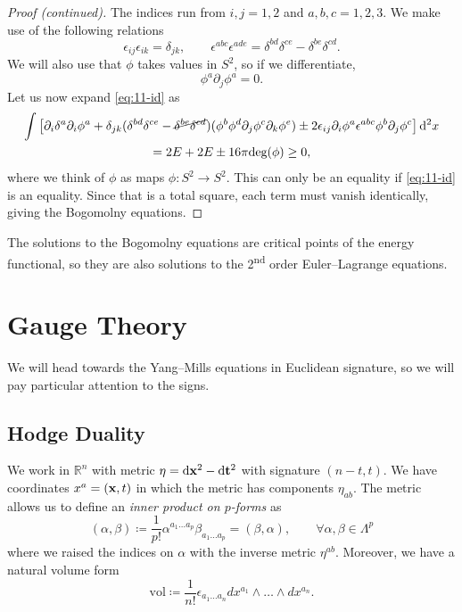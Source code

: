 
\begin{proof}[Proof (continued)]
  The indices run from $i, j = 1, 2$ and $a, b, c = 1, 2, 3$.
  We make use of the following relations
  \begin{equation}
    \epsilon_{ij} \epsilon_{ik} = \delta_{jk},  \qquad
    \epsilon^{abc} \epsilon^{ade} = \delta^{bd} \delta^{ce} - \delta^{be} \delta^{cd}.
  \end{equation}
  We will also use that $\phi$ takes values in $S^2$, so if we differentiate,
  \begin{equation}
    \phi^{a} \partial_{j} \phi^{a} = 0.
  \end{equation}
  Let us now expand \eqref{eq:11-id} as
  \begin{multline}
    \int \left[ \partial_{i} \delta^{a} \partial_{i} \phi^{a} + \delta_{jk} (\delta^{bd} \delta^{ce} - \cancel{\delta^{be} \delta^{cd}}) (\phi^{b} \phi^{d} \partial_{j} \phi^{c} \partial_{k} \phi^{e}) \pm 2 \epsilon_{ij} \partial_{i} \phi^{a} \epsilon^{abc} \phi^{b} \partial_{j} \phi^{c} \right] \dd[2]{x} \\
    = 2 E + 2 E \pm 16 \pi \text{deg}(\phi) \geq 0,
  \end{multline}
  where we think of $\phi$ as maps $\phi\colon S^2 \to S^2$.
  This can only be an equality if \eqref{eq:11-id} is an equality. Since that is a total square, each term must vanish identically, giving the Bogomolny equations.
\end{proof}
The solutions to the Bogomolny equations are critical points of the energy functional, so they are also solutions to the 2\textsuperscript{nd} order Euler--Lagrange equations.

\chapter{Gauge Theory}%
\label{cha:gauge_theory}

We will head towards the Yang--Mills equations in Euclidean signature, so we will pay particular attention to the signs.

\section{Hodge Duality}%
\label{sec:hodge_duality}

We work in $\mathbb{R}^n$ with metric $\eta = \dd{\vb{x}^2} - \dd{\vb{t}^2}$ with signature $(n - t, t)$.
We have coordinates $x^{a} = (\vb{x}, t)$ in which the metric has components $\eta_{ab}$.
The metric allows us to define an \emph{inner product on $p$-forms} as
\begin{equation}
  (\alpha, \beta) \coloneqq \frac{1}{p!} \alpha^{a_1 \dots a_p} \beta_{a_1 \dots a_p} = (\beta, \alpha), \qquad \forall \alpha, \beta \in \Lambda^{p}
\end{equation}
where we raised the indices on $\alpha$ with the inverse metric $\eta^{ab}$.
Moreover, we have a natural volume form
\begin{equation}
  \text{vol} \coloneqq \frac{1}{n!} \epsilon_{a_1 \dots a_n} dx^{a_1} \wedge \dots \wedge d x^{a_n}.
\end{equation}

